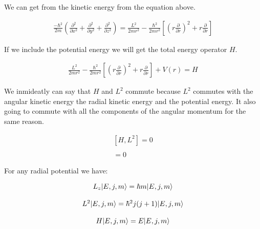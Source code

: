 We can get from the kinetic energy from the equation above.

\begin{equation}
  \begin{array}{c}
    \frac{-\hbar^2}{2m} \left(\frac{\partial^2}{\partial x^2}+\frac{\partial^2}{\partial y^2}+\frac{\partial^2}{\partial z^2}\right) = \frac{L^2}{2mr^2}-\frac{\hbar^2}{2mr^2}\left[\left(r\frac{\partial}{\partial r}\right)^2+r\frac{\partial}{\partial r}\right]
  \end{array}
\end{equation}

If we include the potential energy we will get the total energy operator $H$.

\begin{equation}
  \begin{array}{c}
    \frac{L^2}{2mr^2}-\frac{\hbar^2}{2mr^2}\left[\left(r\frac{\partial}{\partial r}\right)^2+r\frac{\partial}{\partial r}\right] + V(r) = H
  \end{array}
\end{equation}

We inmideatly can say that $H$ and $L^2$ commute because $L^2$ commutes with the angular kinetic energy the radial kinetic energy and the potential energy. It also going to commute with all the components of the angular momentum for the same reason.

\begin{equation}
  \begin{array}{c}
    [H,L^2] = 0
    \\

    \\
    [H,L_a] = 0
  \end{array}
\end{equation}

For any radial potential we have:

\begin{equation}
  \begin{array}{c}
    L_z \lvert E,j,m\rangle = \hbar m \lvert E,j,m\rangle
    \\

    \\
    L^2 \lvert E,j,m\rangle = \hbar^2 j(j+1) \lvert E,j,m\rangle
    \\

    \\
    H \lvert E,j,m\rangle = E \lvert E,j,m\rangle
  \end{array}
\end{equation}

